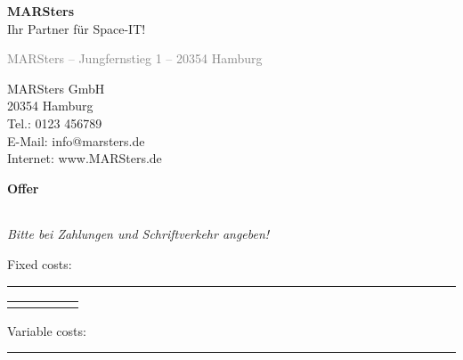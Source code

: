 \documentclass[12pt,a4paper]{article}
\begin{document}
\noindent
\raggedleft
\Huge\textbf{MARSters} \\[0.3em]
\large Ihr Partner für Space-IT! \\
\vspace{2em}
\begin{minipage}[t]{0.5\textwidth}
{\small \textcolor{gray}{MARSters – Jungfernstieg 1 – 20354 Hamburg}} \\[1em]

\end{minipage}
\hfill
\begin{minipage}[t]{0.45\textwidth}
\raggedleft
\vspace{1em}
MARSters GmbH \\
20354 Hamburg \\
Tel.: 0123 456789 \\
E-Mail: info@marsters.de \\
Internet: www.MARSters.de
\end{minipage}

\vspace{1.8em}

\textbf{\LARGE Offer}

\vspace{1em}
\begin{tabularx}{\textwidth}{@{}l X r@{}}

\end{tabularx}

\small\textit{Bitte bei Zahlungen und Schriftverkehr angeben!}

\vspace{1em}
\begin{flushleft}
Fixed costs: \\
\rule{\textwidth}{0.5pt}
\end{flushleft}

\renewcommand{\arraystretch}{1.4}
\begin{tabularx}{\textwidth}{|l|X|r|l|r|}
\hline
\rowcolor{gray!30}


\end{tabularx}
\vspace{8.5em}

\vspace{1em}
\begin{flushleft}
Variable costs: \\
\rule{\textwidth}{0.5pt}
\end{flushleft}
\end{document}
